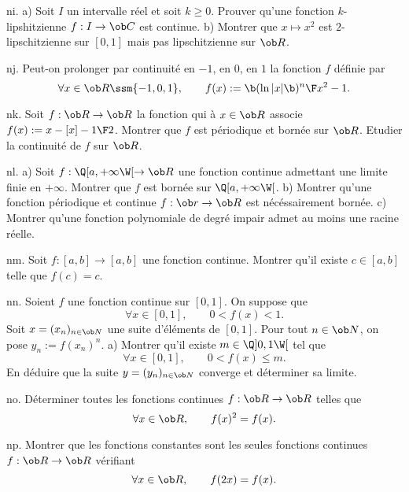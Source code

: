 \exo [Level=1,Fight=1,Learn=1,Type=\Exercices,Field=\Continuité,Origin=] ni. 
a) Soit $I$ un intervalle réel et  soit $k\ge0$. Prouver qu'une fonction $k$-lipshitzienne $f:I\to\ob C$ est continue. \pn
b) Montrer que $x\mapsto x^2$ est $2$-lipschitzienne sur $[0,1]$ mais pas lipschitzienne sur $\ob R$. 

\exo [Level=1,Fight=1,Learn=1,Type=\Exercices,Field=\Continuité,Origin=] nj. 
Peut-on prolonger par continuité en $-1$, en $0$, en $1$ la fonction $f$ définie par 
$$
\forall x\in\ob R\ssm\{-1,0,1\}, \qquad f(x):={\b(\ln|x|\b)^n\F x^2-1}.
$$

\exo [Level=1,Fight=1,Learn=1,Type=\Exercices,Field=\Continuité,Origin=] nk. 
Soit $f:\ob R\to\ob R$ la fonction qui à $x\in\ob R$ associe $f(x):=x-[x]-{1\F 2}$. Montrer que $f$ est périodique et bornée sur $\ob R$. Etudier la continuité de $f$ sur $\ob R$. 

\exo [Level=1,Fight=1,Learn=1,Type=\Exercices,Field=\Continuité,Origin=] nl. 
a) Soit $f:\Q[a,+\infty\W[\to\ob R$ une fonction continue admettant une limite finie en $+\infty$. \pn Montrer que $f$ est bornée sur $\Q[a,+\infty\W[$. \pn
b) Montrer qu'une fonction périodique et continue $f:\ob r\to\ob R$ est nécéssairement bornée. \pn
c) Montrer qu'une fonction polynomiale de degré impair admet au moins une racine réelle. 

\exo [Level=1,Fight=1,Learn=2,Type=\Exercices,Field=\Continuité,Origin=,Indication={On pourra utiliser la fonction $\varphi$ définie sur $[a,b]$ par $\varphi(x):=f(x)-x$.}] nm. 
Soit $f:[a,b]\to[a,b]$ une fonction continue. Montrer qu'il existe $c\in[a,b]$ telle que $f(c)=c$. 


\exo [Level=1,Fight=2,Learn=2,Type=\Exercices,Field=\Continuité,Origin=] nn. 
Soient $f$ une fonction continue sur $[0,1]$. On suppose que 
$$
\forall x\in[0,1], \qquad 0<f(x)<1. 
$$  
Soit $x=(x_n)_{n\in\ob N}$ une suite d'éléments de $[0,1]$. Pour tout $n\in\ob N$, on pose $y_n:=f(x_n)^n$. \pn 
a) Montrer qu'il existe $m\in\Q]0,1\W[$ tel que 
$$
\forall x\in[0,1], \qquad 0<f(x) \le m.  
$$
En déduire que la suite $y=(y_n)_{n\in\ob N}$ converge et déterminer sa limite. 

\exo [Level=1,Fight=1,Learn=2,Type=\Colles,Field=\Continuité,Origin=] no. 
Déterminer toutes les fonctions continues $f:\ob R\to\ob R$ telles que 
$$
\forall x\in\ob R, \qquad f(x)^2=f(x). 
$$

\exo [Level=1,Fight=2,Learn=2,Type=\Colles,Field=\Continuité,Origin=] np. 
Montrer que les fonctions constantes sont les seules fonctions continues $f:\ob R\to\ob R$ vérifiant 
$$
\forall x\in\ob R, \qquad f(2x)=f(x). 
$$


